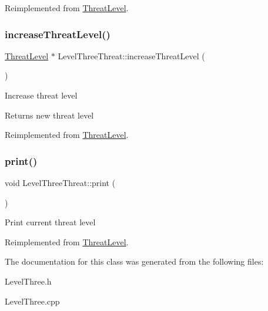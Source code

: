 Reimplemented from \hyperlink{classThreatLevel_a3545ec161fbe4c01beafb9b43624c7e8}{Threat\+Level}.

\mbox{\label{classLevelThreeThreat_a284c2b79a9a85f5e164f15c258c6e9ca}} 
\subsubsection{\texorpdfstring{increase\+Threat\+Level()}{increaseThreatLevel()}}
{\footnotesize\ttfamily \hyperlink{classThreatLevel}{Threat\+Level} $\ast$ Level\+Three\+Threat\+::increase\+Threat\+Level (\begin{DoxyParamCaption}{ }\end{DoxyParamCaption})\hspace{0.3cm}{\ttfamily [virtual]}}

Increase threat level \begin{DoxyReturn}{Returns}
new threat level 
\end{DoxyReturn}


Reimplemented from \hyperlink{classThreatLevel_ae18f6ebe2186ae1b61d4817196f969e3}{Threat\+Level}.

\mbox{\label{classLevelThreeThreat_a3bdd7e61f3938123ce9c705623e0d98a}} 
\subsubsection{\texorpdfstring{print()}{print()}}
{\footnotesize\ttfamily void Level\+Three\+Threat\+::print (\begin{DoxyParamCaption}{ }\end{DoxyParamCaption})\hspace{0.3cm}{\ttfamily [virtual]}}

Print current threat level 

Reimplemented from \hyperlink{classThreatLevel_a5bdff5eeffed8db616ca06091097c138}{Threat\+Level}.



The documentation for this class was generated from the following files\+:\begin{DoxyCompactItemize}
\item 
Level\+Three.\+h\item 
Level\+Three.\+cpp\end{DoxyCompactItemize}
